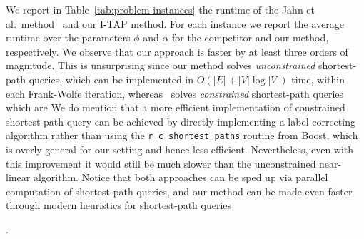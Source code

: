\documentclass{article}
\newif\ifarxiv   %
\begin{document}
\ifarxiv 
Finally, the Pareto frontiers of the I-TAP method for the $0.01$ and $0.05$ increments of the convex combination parameter almost overlap each other for all the transportation networks other than Sioux Falls. Since Sioux Falls has a highly discontinuous unfairness function (cf. Figure~\ref{fig:tt_v_alpha_and_beta_v_alpha_finer_discretization}), it is likely that the $0.05$ increments of $\alpha$ values may not capture all the low total travel time solutions that keep within a $\beta$ bound of unfairness that the $0.01$ increments of $\alpha$ may be able to capture. For all the other datasets, the near equivalence of the Pareto frontiers for the two $\alpha$ discretizations suggests that a good performance of the I-TAP method can be achieved with coarse discretizations of the convex combination parameter set. Thus, we only need to compute a solution to the convex program I-TAP$_{\alpha}$ for relatively few values of $\alpha$ to characterize the Pareto frontier, implying the computational efficiency of the I-TAP method. 
\else
\fi 



 We report in Table~\ref{tab:problem-instances} the runtime of the Jahn et al.\ method~\cite{so-routing-seminal} and our I-TAP method. For each instance we report the average runtime over the parameters $\phi$ and $\alpha$ for the competitor and our method, respectively. We observe that our approach is faster by at least three orders of magnitude. This is unsurprising since our method solves \emph{unconstrained} shortest-path queries, which can be implemented in $O(|E|+|V|\log |V|)$ time, within each Frank-Wolfe iteration, whereas~\cite{so-routing-seminal} solves \emph{constrained} shortest-path queries which are \ifarxiv known to be NP-hard. \fi We do mention that a more efficient implementation of constrained shortest-path query can be achieved by directly implementing a label-correcting algorithm rather than using the \texttt{r\_c\_shortest\_paths} routine from Boost, which is overly general for our setting and hence less efficient. Nevertheless, even with this improvement it would still be much slower than the unconstrained near-linear algorithm. Notice that both approaches can be sped up via parallel computation of shortest-path queries, and our method can be made even faster through modern heuristics for shortest-path queries
\ifarxiv 
in %
transportation networks, such as contraction hierarchies~\cite{GeisbergerETAL12}, as in~\cite{BuchETAL18}.
\else
\cite{BuchETAL18}.
\fi  
\end{document}
